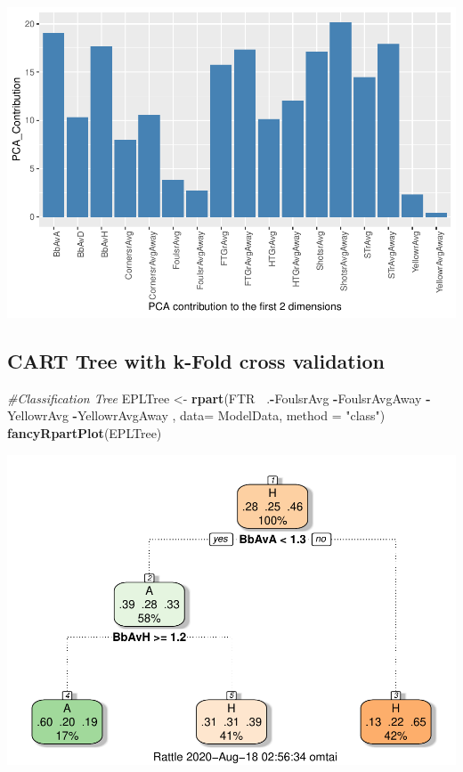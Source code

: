 \documentclass[
]{article}
\newenvironment{Shaded}{\begin{snugshade}}{\end{snugshade}}
\newcommand{\CommentTok}[1]{\textcolor[rgb]{0.56,0.35,0.01}{\textit{#1}}}
\newcommand{\DataTypeTok}[1]{\textcolor[rgb]{0.13,0.29,0.53}{#1}}
\newcommand{\KeywordTok}[1]{\textcolor[rgb]{0.13,0.29,0.53}{\textbf{#1}}}
\newcommand{\NormalTok}[1]{#1}
\newcommand{\OperatorTok}[1]{\textcolor[rgb]{0.81,0.36,0.00}{\textbf{#1}}}
\newcommand{\StringTok}[1]{\textcolor[rgb]{0.31,0.60,0.02}{#1}}
\begin{document}
\begin{center}\includegraphics{EPL_Model_files/figure-latex/unnamed-chunk-7-3} \end{center}

\hypertarget{cart-tree-with-k-fold-cross-validation}{%
\subsection{CART Tree with k-Fold cross
validation}\label{cart-tree-with-k-fold-cross-validation}}

\begin{Shaded}
\begin{Highlighting}[]
\CommentTok{#Classification Tree}
\NormalTok{EPLTree <-}\StringTok{ }\KeywordTok{rpart}\NormalTok{(FTR}\OperatorTok{~}\StringTok{ }\NormalTok{.}\OperatorTok{-}\NormalTok{FoulsrAvg  }\OperatorTok{-}\NormalTok{FoulsrAvgAway }\OperatorTok{-}\NormalTok{YellowrAvg }\OperatorTok{-}\NormalTok{YellowrAvgAway , }\DataTypeTok{data=}\NormalTok{ ModelData, }\DataTypeTok{method =} \StringTok{"class"}\NormalTok{)}
\KeywordTok{fancyRpartPlot}\NormalTok{(EPLTree)}
\end{Highlighting}
\end{Shaded}

\begin{center}\includegraphics{EPL_Model_files/figure-latex/unnamed-chunk-8-1} \end{center}
\end{document}
